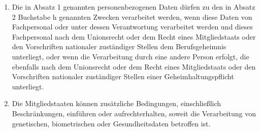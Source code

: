 \documentclass[A4, 12pt]{scrbook}
\begin{document}
\begin{enumerate}
\begin{enumerate}[label=\alph*)]
                \end{enumerate}
            \item Die in Absatz 1 genannten personenbezogenen Daten dürfen zu den in Absatz 2 Buchstabe h genannten Zwecken verarbeitet werden, wenn diese Daten von Fachpersonal oder unter dessen Verantwortung verarbeitet werden und dieses Fachpersonal nach dem Unionsrecht oder dem Recht eines Mitgliedstaats oder den Vorschriften nationaler zuständiger Stellen dem Berufsgeheimnis unterliegt, oder wenn die Verarbeitung durch eine andere Person erfolgt, die ebenfalls nach dem Unionsrecht oder dem Recht eines Mitgliedstaats oder den Vorschriften nationaler zuständiger Stellen einer Geheimhaltungspflicht unterliegt.
            \item Die Mitgliedstaaten können zusätzliche Bedingungen, einschließlich Beschränkungen, einführen oder aufrechterhalten, soweit die Verarbeitung von genetischen, biometrischen oder Gesundheitsdaten betroffen ist. 
        \end{enumerate}
\end{document}
